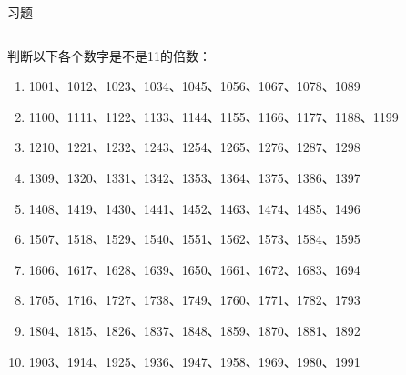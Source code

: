 \documentclass[aspectratio=169]{ctexbeamer} %
\begin{document}
\begin{frame}[t]{习题}
\begin{columns}
\begin{spacing}{1.2}
\normalsize
判断以下各个数字是不是11的倍数：
\begin{enumerate}[label={\arabic*.}, start=11]
\item 1001、1012、1023、1034、1045、1056、1067、1078、1089
\item 1100、1111、1122、1133、1144、1155、1166、1177、1188、1199
\item 1210、1221、1232、1243、1254、1265、1276、1287、1298
\item 1309、1320、1331、1342、1353、1364、1375、1386、1397
\item 1408、1419、1430、1441、1452、1463、1474、1485、1496
\item 1507、1518、1529、1540、1551、1562、1573、1584、1595
\item 1606、1617、1628、1639、1650、1661、1672、1683、1694
\item 1705、1716、1727、1738、1749、1760、1771、1782、1793
\item 1804、1815、1826、1837、1848、1859、1870、1881、1892
\item 1903、1914、1925、1936、1947、1958、1969、1980、1991
\end{enumerate}
\end{spacing}
\end{columns}
\end{frame}
\end{document}
